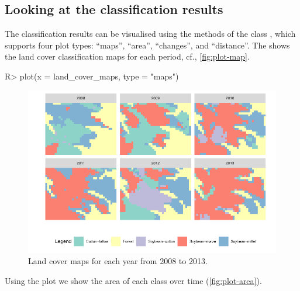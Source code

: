 \documentclass[article,shortnames]{jss}
\begin{document}
\hypertarget{looking-at-the-classification-results}{%
\subsection{Looking at the classification
results}\label{looking-at-the-classification-results}}

The classification results can be visualised using the 
methods of the class , which supports four plot types:
``maps'', ``area'', ``changes'', and ``distance''. The
 shows the land cover classification maps for each
period, cf., \autoref{fig:plot-map}.

\begin{CodeChunk}

\begin{CodeInput}
R> plot(x = land_cover_maps, type = "maps")
\end{CodeInput}
\begin{figure}[!h]

{\centering \includegraphics{dtwSat_files/figure-latex/plot-map-1} 

}

\caption[Land cover maps for each year from 2008 to 2013]{Land cover maps for each year from 2008 to 2013.}\label{fig:plot-map}
\end{figure}
\end{CodeChunk}

Using the plot  we show the area of each class over
time (\autoref{fig:plot-area}).
\end{document}

